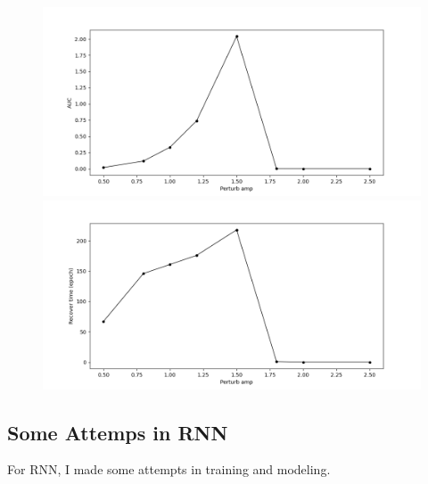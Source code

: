 \documentclass[12pt, a4paper]{article}
\begin{document}
\begin{figure}[H]
    \centering
    \includegraphics[width=\textwidth]{FNN/fig/0221_abb05_perturbamp_auc.png} \\
    \includegraphics[width=\textwidth]{FNN/fig/0221_abb05_perturbamp_rectime.png} \\
\end{figure}
\newpage

\subsection*{Some Attemps in RNN}

For RNN, I made some attempts in training and modeling. 
\end{document}
